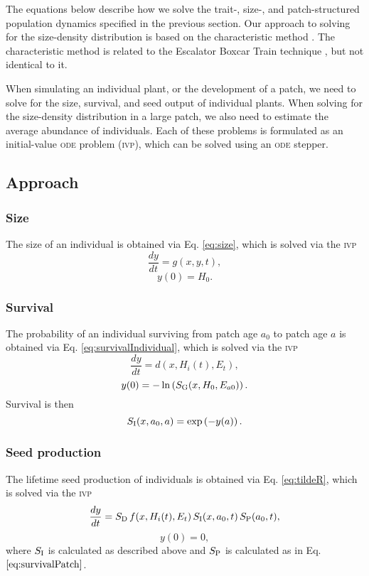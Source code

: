 \documentclass[10pt,twoside]{article}
\begin{document}
The equations below describe how we solve the trait-, size-, and patch-structured
population dynamics specified in the previous section.
Our approach to solving for the size-density distribution is based on the characteristic method \citep{Angulo-2004}. The characteristic method is related to
the Escalator Boxcar Train technique
\citep{Deroos-1988, Deroos-1997, Deroos-1992}, but not identical to it.

When simulating an individual plant, or the development of a
patch, we need to solve for the size, survival, and seed
output of individual plants. When solving for the size-density distribution
in a large patch, we also need to estimate the average abundance of individuals.
Each of these problems is formulated as an initial-value \textsc{ode} problem
(\textsc{ivp}), which can be solved using an \textsc{ode} stepper.

\subsection{Approach}

\subsubsection{Size}\label{size}

The size of an individual is obtained via Eq.
\ref{eq:size}, which is solved via the \textsc{ivp}
\[\frac{dy}{dt} = g(x, y, t) ,\] \[ y(0) = H_0.\]

\subsubsection{Survival}\label{survival}

The probability of an individual surviving from patch age
\(a_0\) to patch age \(a\) is obtained via Eq. \ref{eq:survivalIndividual},
which is solved via the \textsc{ivp}
\[\frac{dy}{dt} = d(x, H_i(t) , E_t),\]
\[ y(0) = - \ln\left(S_{\rm G} (x, H_0, E_{a0})\right) .\]
Survival is then \[ S_{\rm I} (x, a_0, a) = \exp\left( - y(a) \right).\]

\subsubsection{Seed production}\label{seed-production}

The lifetime seed production of individuals is
obtained via Eq. \ref{eq:tildeR}, which is solved via the \textsc{ivp}
\[\frac{dy}{dt} = S_{\rm D} \, f(x, H_i(t), E_t) \, S_{\rm I} (x, a_0,t) \, S_{\rm P} (a_0, t),\]
\[ y(0) = 0,\] where \(S_{\rm I}\) is calculated as described
above and \(S_{\rm P}\) is calculated as in Eq.
\(\ref{eq:survivalPatch}\).
\end{document}
